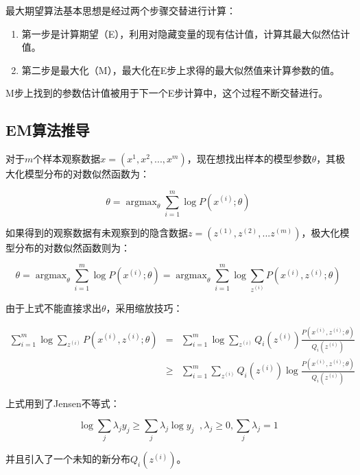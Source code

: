 最大期望算法基本思想是经过两个步骤交替进行计算：

\begin{enumerate}\itemsep0em
		\item 第一步是计算期望（E），利用对隐藏变量的现有估计值，计算其最大似然估计值。
		\item 第二步是最大化（M），最大化在E步上求得的最大似然值来计算参数的值。
\end{enumerate}

M步上找到的参数估计值被用于下一个E步计算中，这个过程不断交替进行。


\subsection{EM算法推导}

对于$m$个样本观察数据$x=(x^{1},x^{2},...,x^{m})$，现在想找出样本的模型参数$\theta$，其极大化模型分布的对数似然函数为：

$$
\theta = \mathop{\arg\max}_\theta\sum\limits_{i=1}^m \log P(x^{(i)};\theta)
$$

如果得到的观察数据有未观察到的隐含数据$z=(z^{(1)},z^{(2)},...z^{(m)})$，极大化模型分布的对数似然函数则为：

\begin{equation} \label{eq:2.2}
\theta =\mathop{\arg\max}_\theta\sum\limits_{i=1}^m \log P(x^{(i)};\theta) = \mathop{\arg\max}_\theta\sum\limits_{i=1}^m \log\sum\limits_{z^{(i)}}P(x^{(i)}, z^{(i)};\theta)
\end{equation}

由于上式不能直接求出$\theta$，采用缩放技巧：

\begin{equation}\label{eq:2.3}
	\begin{aligned}
		\sum\limits_{i=1}^m \log\sum\limits_{z^{(i)}}P(x^{(i)}, z^{(i)};\theta)&=& \sum\limits_{i=1}^m \log\sum\limits_{z^{(i)}}Q_i(z^{(i)})\frac{P(x^{(i)}, z^{(i)};\theta)}{Q_i(z^{(i)})} \\
		&\ge& \sum\limits_{i=1}^m \sum\limits_{z^{(i)}}Q_i(z^{(i)})\log\frac{P(x^{(i)}, z^{(i)};\theta)}{Q_i(z^{(i)})}
	\end{aligned}
\end{equation}

上式用到了Jensen不等式：

$$
\log\sum\limits_j\lambda_jy_j \geqslant \sum\limits_j\lambda_j\log y_j\;\;,  \lambda_j \geqslant 0, \sum\limits_j\lambda_j =1
$$

并且引入了一个未知的新分布$Q_i(z^{(i)})$。

